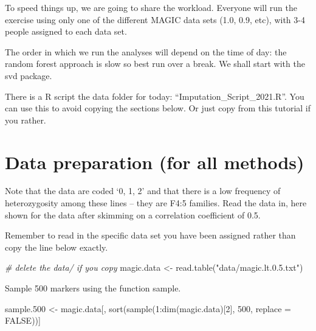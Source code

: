 \documentclass[
]{book}
\makeatletter
\newenvironment{Shaded}{\begin{snugshade}}{\end{snugshade}}
\newcommand{\AttributeTok}[1]{\textcolor[rgb]{0.77,0.63,0.00}{#1}}
\newcommand{\CommentTok}[1]{\textcolor[rgb]{0.56,0.35,0.01}{\textit{#1}}}
\newcommand{\ConstantTok}[1]{\textcolor[rgb]{0.00,0.00,0.00}{#1}}
\newcommand{\DecValTok}[1]{\textcolor[rgb]{0.00,0.00,0.81}{#1}}
\newcommand{\FloatTok}[1]{\textcolor[rgb]{0.00,0.00,0.81}{#1}}
\newcommand{\FunctionTok}[1]{\textcolor[rgb]{0.00,0.00,0.00}{#1}}
\newcommand{\NormalTok}[1]{#1}
\newcommand{\OtherTok}[1]{\textcolor[rgb]{0.56,0.35,0.01}{#1}}
\newcommand{\SpecialCharTok}[1]{\textcolor[rgb]{0.00,0.00,0.00}{#1}}
\newcommand{\StringTok}[1]{\textcolor[rgb]{0.31,0.60,0.02}{#1}}
\newenvironment{kframe}{%
\medskip{}
\setlength{\fboxsep}{.8em}
 \def\at@end@of@kframe{}%
 \ifinner\ifhmode%
  \def\at@end@of@kframe{\end{minipage}}%
  \begin{minipage}{\columnwidth}%
 \fi\fi%
 \def\FrameCommand##1{\hskip\@totalleftmargin \hskip-\fboxsep
 \colorbox{shadecolor}{##1}\hskip-\fboxsep
     \hskip-\linewidth \hskip-\@totalleftmargin \hskip\columnwidth}%
 \MakeFramed {\advance\hsize-\width
   \@totalleftmargin\z@ \linewidth\hsize
   \@setminipage}}%
 {\par\unskip\endMakeFramed%
 \at@end@of@kframe}
\newenvironment{rmdblock}[1]
  {
  \begin{itemize}
  \renewcommand{\labelitemi}{
    \raisebox{-.7\height}[0pt][0pt]{
      {\setkeys{Gin}{width=3em,keepaspectratio}\texttt{[image: images/\#1]}}
    }
  }
  \setlength{\fboxsep}{1em}
  \begin{kframe}
  \item
  }
  {
  \end{kframe}
  \end{itemize}
  }
\newenvironment{rmdnote}
  {\begin{rmdblock}{note}}
  {\end{rmdblock}}
\newenvironment{rmdwarning}
  {\begin{rmdblock}{warning}}
  {\end{rmdblock}}
\makeatother
\begin{document}
To speed things up, we are going to share the workload. Everyone will run the exercise using only one of the different MAGIC data sets (1.0, 0.9, etc), with 3-4 people assigned to each data set.

The order in which we run the analyses will depend on the time of day: the random forest approach is slow so best run over a break. We shall start with the svd package.

\begin{rmdnote}
There is a R script the data folder for today: ``Imputation\_Script\_2021.R''. You can use this to avoid copying the sections below. Or just copy from this tutorial if you rather.
\end{rmdnote}

\hypertarget{data-preparation-for-all-methods}{%
\section{Data preparation (for all methods)}\label{data-preparation-for-all-methods}}

Note that the data are coded `0, 1, 2' and that there is a low frequency of heterozygosity among these lines -- they are F4:5 families. Read the data in, here shown for the data after skimming on a correlation coefficient of 0.5.

\begin{rmdwarning}
Remember to read in the specific data set you have been assigned rather than copy the line below exactly.
\end{rmdwarning}

\begin{Shaded}
\begin{Highlighting}[]
\CommentTok{\# delete the \textquotesingle{}data/\textquotesingle{} if you copy}
\NormalTok{magic.data }\OtherTok{\textless{}{-}} \FunctionTok{read.table}\NormalTok{(}\StringTok{"data/magic.lt.0.5.txt"}\NormalTok{)}
\end{Highlighting}
\end{Shaded}

Sample 500 markers using the function sample.

\begin{Shaded}
\begin{Highlighting}[]
\NormalTok{sample}\FloatTok{.500} \OtherTok{\textless{}{-}}\NormalTok{ magic.data[, }\FunctionTok{sort}\NormalTok{(}\FunctionTok{sample}\NormalTok{(}\DecValTok{1}\SpecialCharTok{:}\FunctionTok{dim}\NormalTok{(magic.data)[}\DecValTok{2}\NormalTok{], }
    \DecValTok{500}\NormalTok{, }\AttributeTok{replace =} \ConstantTok{FALSE}\NormalTok{))]}
\end{Highlighting}
\end{Shaded}
\end{document}

